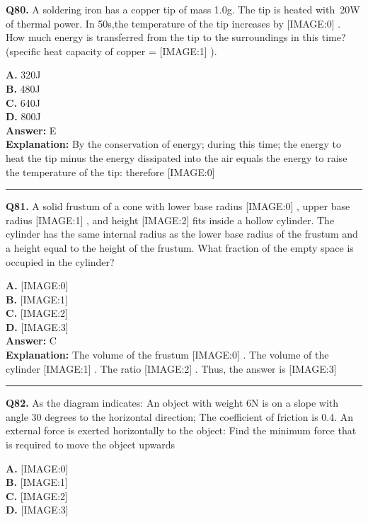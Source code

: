 \documentclass[12pt]{article}
\begin{document}
\noindent
\textbf{Q80.} A soldering iron has a copper tip of mass 1.0g.
The tip is heated with 20W of thermal power. In 50s,the temperature of the tip increases by
[IMAGE:0]
.
How much energy is transferred from the tip to the surroundings in this time? (specific heat capacity of copper =
[IMAGE:1]
).



\textbf{A.} 320J \\
\textbf{B.} 480J \\
\textbf{C.} 640J \\
\textbf{D.} 800J \\

\textbf{Answer:} E \\
\textbf{Explanation:} By the conservation of energy; during this time; the energy to heat the tip minus the energy dissipated into the air equals the energy to raise the temperature of the tip: therefore
[IMAGE:0]

\hrule
\vspace{1em}


\noindent
\textbf{Q81.} A solid frustum of a cone with lower base radius
[IMAGE:0]
, upper base radius
[IMAGE:1]
, and height
[IMAGE:2]
fits inside a hollow cylinder. The cylinder has the same internal radius as the lower base radius of the frustum and a height equal to the height of the frustum. What fraction of the empty space is occupied in the cylinder?



\textbf{A.} [IMAGE:0] \\
\textbf{B.} [IMAGE:1] \\
\textbf{C.} [IMAGE:2] \\
\textbf{D.} [IMAGE:3] \\

\textbf{Answer:} C \\
\textbf{Explanation:} The volume of the frustum
[IMAGE:0]
. The volume of the cylinder
[IMAGE:1]
. The ratio
[IMAGE:2]
.
Thus, the answer is
[IMAGE:3]

\hrule
\vspace{1em}


\noindent
\textbf{Q82.} As the diagram indicates: An object with weight 6N is on a slope with angle 30 degrees to the horizontal direction; The coefficient of friction is 0.4. An external force is exerted horizontally to the object: Find the minimum force that is required to move the object upwards



\textbf{A.} [IMAGE:0] \\
\textbf{B.} [IMAGE:1] \\
\textbf{C.} [IMAGE:2] \\
\textbf{D.} [IMAGE:3] \\
\end{document}
